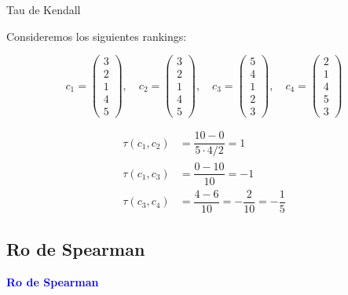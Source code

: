 \documentclass[10pt,hyperref={unicode}]{beamer}
\begin{document}
	\begin{frame}{Tau de Kendall}
		\begin{ejemplo}
			Consideremos los siguientes rankings:
			
			\begin{equation*}
			c_1 = \left( \begin{array}{c}
			3\\
			2\\
			1\\
			4\\
			5
			\end{array} \right), \quad
			c_2 = \left( \begin{array}{c}
			3\\
			2\\
			1\\
			4\\
			5
			\end{array} \right), \quad
			c_3 = \left( \begin{array}{c}
			5\\
			4\\
			1\\
			2\\
			3
			\end{array} \right), \quad
			c_4 = \left( \begin{array}{c}
			2\\
			1\\
			4\\
			5\\
			3
			\end{array} \right)
			\end{equation*}
			
			\begin{align*}
			\tau(c_1, c_2) & = \dfrac{10 - 0}{5 \cdot 4/2} = 1\\
			\tau(c_1, c_3) & = \dfrac{0 - 10}{10} = -1\\
			\tau(c_3, c_4) & = \dfrac{4 -  6}{10} = -\dfrac{2}{10} = - \dfrac{1}{5}
			\end{align*}
			
		\end{ejemplo}		
	\end{frame}
	
	\subsection{Ro de Spearman}
	
	\begin{frame}
		\begin{center}
			\Huge\textbf{\textsf{\textcolor{blue}{Ro de Spearman}}}
		\end{center}
	\end{frame}
	
\end{document}
